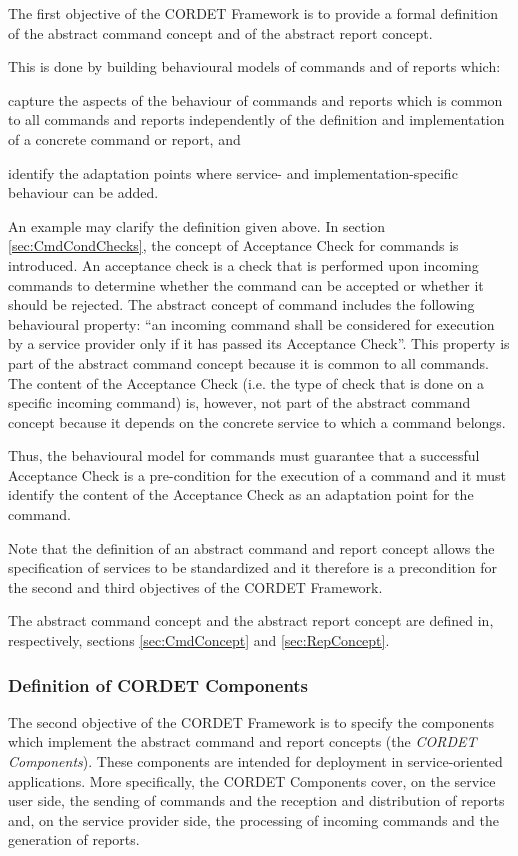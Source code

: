 \documentclass[a4paper,10pt]{article}
\newenvironment{fw_enumerate}					%
{\begin{enumerate}
  \setlength{\itemsep}{1mm}
  \setlength{\parskip}{0pt}
  \setlength{\parsep}{0pt}}
{\end{enumerate}}
\begin{document}
The first objective of the CORDET Framework is to provide a formal definition of the abstract command concept and of the abstract report concept. 

This is done by building behavioural models of commands and of reports which:

\begin{fw_enumerate}
\item{} capture the aspects of the behaviour of commands and reports which is common to all commands and reports independently of the definition and implementation of a concrete command or report, and
\item{} identify the adaptation points where service- and implementation-specific behaviour can be added.
\end{fw_enumerate}

An example may clarify the definition given above. 
In section \ref{sec:CmdCondChecks}, the concept of Acceptance Check for commands is introduced. 
An acceptance check is a check that is performed upon incoming commands to determine whether the command can be accepted or whether it should be rejected. 
The abstract concept of command includes the following behavioural property: “an incoming command shall be considered for execution by a service provider only if it has passed its Acceptance Check”. 
This property is part of the abstract command concept because it is common to all commands. 
The content of the Acceptance Check (i.e. the type of check that is done on a specific incoming command) is, however, not part of the abstract command concept because it depends on the concrete service to which a command belongs.

Thus, the behavioural model for commands must guarantee that a successful Acceptance Check is a pre-condition for the execution of a command and it must identify the content of the Acceptance Check as an adaptation point for the command.

Note that the definition of an abstract command and report concept allows the specification of services to be standardized and it therefore is a precondition for the second and third objectives of the CORDET Framework. 

The abstract command concept and the abstract report concept are defined in, respectively, sections \ref{sec:CmdConcept} and \ref{sec:RepConcept}.

\subsubsection{Definition of CORDET Components}\label{sec:DefCrCmp}
The second objective of the CORDET Framework is to specify the components which implement the abstract command and report concepts (the \textit{CORDET Components}). 
These components are intended for deployment in service-oriented applications. 
More specifically, the CORDET Components cover, on the service user side, the sending of commands and the reception and distribution of reports and, on the service provider side, the processing of incoming commands and the generation of reports.
\end{document}
